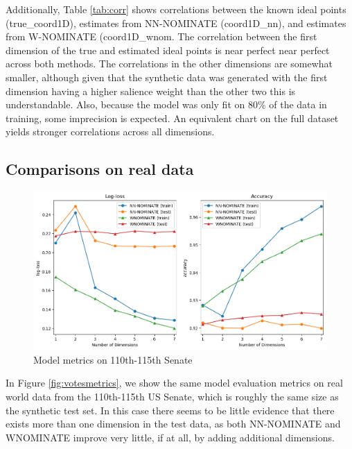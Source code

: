 \documentclass[11pt,]{article}
\begin{document}
Additionally, Table \ref{tab:corr} shows correlations between the known
ideal points (true\_coord1D), estimates from NN-NOMINATE (coord1D\_nn),
and estimates from W-NOMINATE (coord1D\_wnom. The correlation between
the first dimension of the true and estimated ideal points is near
perfect near perfect across both methods. The correlations in the other
dimensions are somewhat smaller, although given that the synthetic data
was generated with the first dimension having a higher salience weight
than the other two this is understandable. Also, because the model was
only fit on 80\% of the data in training, some imprecision is expected.
An equivalent chart on the full dataset yields stronger correlations
across all dimensions.

\subsection{Comparisons on real data}\label{comparisons-on-real-data}

\begin{figure}

{\centering \includegraphics[width=1\linewidth]{votes_metrics_with_wnom}

}

\caption{\label{fig:votesmetrics}Model metrics on 110th-115th Senate}\label{fig:unnamed-chunk-7}
\end{figure}

In Figure \ref{fig:votesmetrics}, we show the same model evaluation
metrics on real world data from the 110th-115th US Senate, which is
roughly the same size as the synthetic test set. In this case there
seems to be little evidence that there exists more than one dimension in
the test data, as both NN-NOMINATE and WNOMINATE improve very little, if
at all, by adding additional dimensions.
\end{document}

